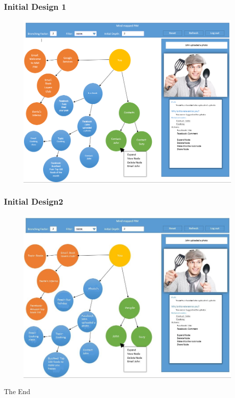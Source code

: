 \documentclass{beamer}
\begin{document}
		\begin{frame}
		\frametitle{Initial Design 1}
			\begin{figure}
				\includegraphics[scale=0.35]{initdesign.png}
			\end{figure}
		\end{frame}
		
		\begin{frame}
		\frametitle{Initial Design2}
			\begin{figure}
				\includegraphics[scale=0.35]{initDesign2.jpg}
			\end{figure}
		\end{frame}
		\begin{frame}
			\Huge{\centerline{The End}}
		\end{frame}
\end{document}
